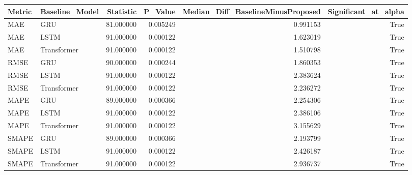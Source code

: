 \begin{tabular}{llrrrr}
\toprule
Metric & Baseline_Model & Statistic & P_Value & Median_Diff_BaselineMinusProposed & Significant_at_alpha \\
\midrule
MAE & GRU & 81.000000 & 0.005249 & 0.991153 & True \\
MAE & LSTM & 91.000000 & 0.000122 & 1.623019 & True \\
MAE & Transformer & 91.000000 & 0.000122 & 1.510798 & True \\
RMSE & GRU & 90.000000 & 0.000244 & 1.860353 & True \\
RMSE & LSTM & 91.000000 & 0.000122 & 2.383624 & True \\
RMSE & Transformer & 91.000000 & 0.000122 & 2.236272 & True \\
MAPE & GRU & 89.000000 & 0.000366 & 2.254306 & True \\
MAPE & LSTM & 91.000000 & 0.000122 & 2.386106 & True \\
MAPE & Transformer & 91.000000 & 0.000122 & 3.155629 & True \\
SMAPE & GRU & 89.000000 & 0.000366 & 2.193799 & True \\
SMAPE & LSTM & 91.000000 & 0.000122 & 2.426187 & True \\
SMAPE & Transformer & 91.000000 & 0.000122 & 2.936737 & True \\
\bottomrule
\end{tabular}
